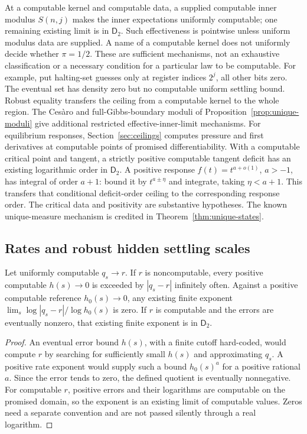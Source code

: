 At a computable kernel and computable data, a supplied computable
inner modulus $S(n,j)$ makes
the inner expectations uniformly computable; one remaining existing
limit is in $\mathsf D_2$. Such effectiveness is pointwise unless
uniform modulus data are supplied. A name of a computable kernel
does not uniformly decide whether $\pi=1/2$. These are sufficient
mechanisms, not an exhaustive classification or a necessary condition
for a particular law to be computable. For example, put halting-set
guesses only at register indices $2^j$, all other bits zero. The
eventual set has density zero but no computable uniform settling
bound. Robust equality transfers the ceiling from a computable kernel
to the whole region. The Ces\`aro and full-Gibbs-boundary moduli of
Proposition~\ref{prop:unique-moduli} give additional restricted
effective-inner-limit mechanisms.
For equilibrium responses, Section~\ref{sec:ceilings} computes pressure
and first derivatives at computable points of promised differentiability.
With a computable critical point and tangent, a strictly positive
computable tangent deficit has an existing logarithmic order in
$\mathsf D_2$. A positive response $f(t)=t^{a+o(1)}$, $a>-1$,
has integral of order $a+1$: bound it by $t^{a\pm\eta}$ and
integrate, taking $\eta<a+1$. This transfers that conditional
deficit-order ceiling to the corresponding response order. The
critical data and positivity are substantive hypotheses. The known
unique-measure mechanism is credited in Theorem~\ref{thm:unique-states}.

\subsection{Rates and robust hidden settling scales}
\begin{proposition}
\label{prop:robust-rates}
Let uniformly computable $q_s\to r$. If $r$ is noncomputable, every
positive computable $h(s)\to0$ is exceeded by $|q_s-r|$ infinitely
often. Against a positive computable reference $h_0(s)\to0$, any
existing finite exponent $\lim_s\log|q_s-r|/\log h_0(s)$ is zero.
If $r$ is computable and the errors are eventually nonzero, that
existing finite exponent is in $\mathsf D_2$.
\end{proposition}
\begin{proof}
An eventual error bound $h(s)$, with a finite cutoff hard-coded,
would compute $r$ by searching for sufficiently small $h(s)$ and
approximating $q_s$. A positive rate exponent would supply such
a bound $h_0(s)^a$ for a positive rational $a$. Since the error
tends to zero, the defined quotient is eventually nonnegative.
For computable $r$, positive errors and their logarithms are
computable on the promised domain, so the exponent is an existing
limit of computable values. Zeros need a separate convention and
are not passed silently through a real logarithm.
\end{proof}

